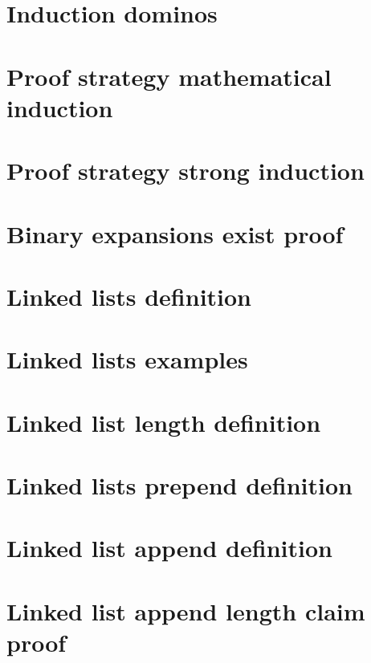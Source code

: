 \section*{Induction dominos}

\vfill
\section*{Proof strategy mathematical induction}

\vfill
\section*{Proof strategy strong induction}

\vfill
\section*{Binary expansions exist proof}

\vfill
\section*{Linked lists definition}

\vfill
\section*{Linked lists examples}

\vfill
\section*{Linked list length definition}

\vfill
\section*{Linked lists prepend definition}

\vfill
\section*{Linked list append definition}

\vfill
\section*{Linked list append length claim proof}

\vfill
